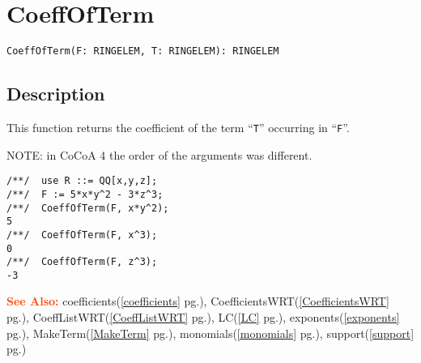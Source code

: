 \documentclass[a4paper]{mybook}
\newenvironment{command}{}{} %
\newcommand\SeeAlso{\par\textcolor{OrangeRed}{\textbf{\large See Also: }}}
\begin{document}
\section{CoeffOfTerm}
\label{CoeffOfTerm}
\begin{command} %


\begin{Verbatim}[label=syntax, rulecolor=\color{MidnightBlue},
frame=single]
CoeffOfTerm(F: RINGELEM, T: RINGELEM): RINGELEM
\end{Verbatim}


\subsection*{Description}

This function returns the coefficient of the term ``\verb&T&'' occurring in ``\verb&F&''.
\par 
NOTE: in CoCoA 4 the order of the arguments was different.
\begin{Verbatim}[label=example, rulecolor=\color{PineGreen}, frame=single]
/**/  use R ::= QQ[x,y,z];
/**/  F := 5*x*y^2 - 3*z^3;
/**/  CoeffOfTerm(F, x*y^2);
5
/**/  CoeffOfTerm(F, x^3);
0
/**/  CoeffOfTerm(F, z^3);
-3
\end{Verbatim}


\SeeAlso %
  coefficients(\ref{coefficients} pg.\pageref{coefficients}), 
    CoefficientsWRT(\ref{CoefficientsWRT} pg.\pageref{CoefficientsWRT}), 
    CoeffListWRT(\ref{CoeffListWRT} pg.\pageref{CoeffListWRT}), 
    LC(\ref{LC} pg.\pageref{LC}), 
    exponents(\ref{exponents} pg.\pageref{exponents}), 
    MakeTerm(\ref{MakeTerm} pg.\pageref{MakeTerm}), 
    monomials(\ref{monomials} pg.\pageref{monomials}), 
    support(\ref{support} pg.\pageref{support})
\end{command} %
\end{document}
